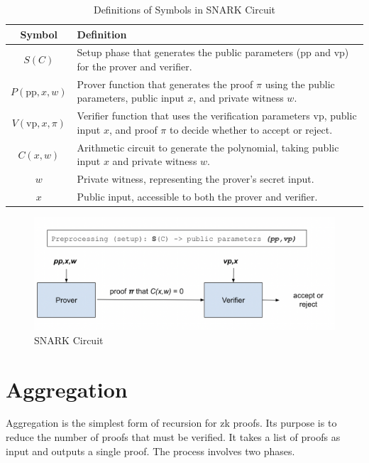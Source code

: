 \begin{table}[H]
   \centering
   \caption{Definitions of Symbols in SNARK Circuit}
   \label{tab:snark_symbols}
   \begin{tabular}{|c|p{12cm}|}
   \hline
   \textbf{Symbol} & \textbf{Definition} \\ \hline
   \( S(C) \) & Setup phase that generates the public parameters (\( \text{pp} \) and \( \text{vp} \)) for the prover and verifier. \\ \hline
   \( P(\text{pp}, x, w) \) & Prover function that generates the proof \( \pi \) using the public parameters, public input \( x \), and private witness \( w \). \\ \hline
   \( V(\text{vp}, x, \pi) \) & Verifier function that uses the verification parameters \( \text{vp} \), public input \( x \), and proof \( \pi \) to decide whether to accept or reject. \\ \hline
   \( C(x, w) \) & Arithmetic circuit to generate the polynomial, taking public input \( x \) and private witness \( w \). \\ \hline
   \( w \) & Private witness, representing the prover's secret input. \\ \hline
   \( x \) & Public input, accessible to both the prover and verifier. \\ \hline
   \end{tabular}
   \end{table}
   

\begin{figure}[H]
\centering
\includegraphics[width=130mm]{SNARKCircuit.png}
\caption{SNARK Circuit \cite{ZKM2}}
\label{overflow}
\end{figure}



\section{Aggregation}
 Aggregation is the simplest form of recursion for zk proofs. Its purpose is to reduce the number of proofs that must be verified. 
 It takes a list of proofs as input and outputs a single proof.
 The process involves two phases.
 
